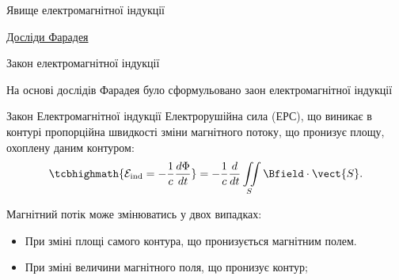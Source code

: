 \documentclass[onlytextwidth]{beamer}
\begin{document}
\begin{frame}{Явище електромагнітної індукції}{}
\begin{overprint}
\begin{center}
\begin{pict}
			\end{pict}
			\href{https://youtu.be/GrBYG8NIUoU}{\color{blue}\small Досліди Фарадея}
		\end{center}
	\end{overprint}
        \end{frame}



\begin{frame}{Закон електромагнітної індукції}{}
	\begin{block}{}
		На основі дослідів Фарадея було сформульовано заон електромагнітної індукції
	\end{block}
	\begin{block}{Закон Електромагнітної індукції}\justifying
		Електрорушійна сила (ЕРС), що виникає в контурі пропорційна швидкості зміни магнітного потоку, що пронизує площу, охоплену даним контуром:
		\begin{equation*}
			\tcbhighmath{\mathcal{E}_\text{ind} =  -\frac1c \frac{d\Phi}{dt}} = -\frac1c \frac{d}{dt} \iint\limits_S \Bfield\cdot\vect{S}.
		\end{equation*}
	\end{block}
	\begin{block}{}
		Магнітний потік може змінюватись  у двох випадках:
		\begin{itemize}
			\item При зміні площі самого контура, що пронизується магнітним полем.
			\item При зміні величини магнітного поля, що пронизує контур;
		\end{itemize}
	\end{block}
\end{frame}
\end{document}
